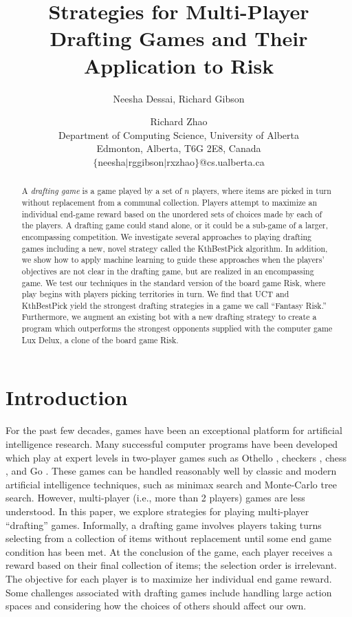 \documentclass[letterpaper]{article}
\title{Strategies for Multi-Player Drafting Games and Their Application to Risk}
\author{Neesha Dessai, Richard Gibson \and Richard Zhao \\
Department of Computing Science, University of Alberta \\
Edmonton, Alberta, T6G 2E8, Canada \\
$\{$neesha$\mid$rggibson$\mid$rxzhao$\}$@cs.ualberta.ca}
\numberwithin{equation}{section}
\numberwithin{theorem}{section}
\numberwithin{lemma}{section}
\numberwithin{df}{section}
\begin{document}
\maketitle

\begin{abstract}
A \emph{drafting game} is a game played by a set of $n$ players, where items are picked in turn without replacement from a communal collection.  Players attempt to maximize an individual end-game reward based on the unordered sets of choices made by each of the players.  A drafting game could stand alone, or it could be a sub-game of a larger, encompassing competition.  We investigate several approaches to playing drafting games including a new, novel strategy called the KthBestPick algorithm.  In addition, we show how to apply machine learning to guide these approaches when the players' objectives are not clear in the drafting game, but are realized in an encompassing game.  We test our techniques in the standard version of the board game Risk, where play begins with players picking territories in turn.  We find that UCT and KthBestPick yield the strongest drafting strategies in a game we call ``Fantasy Risk.''  Furthermore, we augment an existing bot with a new drafting strategy to create a program which outperforms the strongest opponents supplied with the computer game Lux Delux, a clone of the board game Risk.
\end{abstract}

\section{Introduction}


For the past few decades, games have been an exceptional platform for artificial intelligence research.  Many successful computer programs have been developed which play at expert levels in two-player games such as Othello \cite{Othello}, 
checkers \cite{Chinook}, chess \cite{DeepBlue}, 
and Go \cite{ComputerGo}.  These games can be handled reasonably well by classic and modern artificial intelligence techniques, such as minimax search and Monte-Carlo tree search.  However, multi-player (i.e., more than 2 players) games are less understood.  In this paper, we explore strategies for playing multi-player ``drafting'' games.  Informally, a drafting game involves players taking turns selecting from a collection of items without replacement until some end game condition has been met.  At the conclusion of the game, each player receives a reward based on their final collection of items; the selection order is irrelevant.  The objective for each player is to maximize her individual end game reward.  Some challenges associated with drafting games include handling large action spaces and considering how the choices of others should affect our own.
\end{document}
